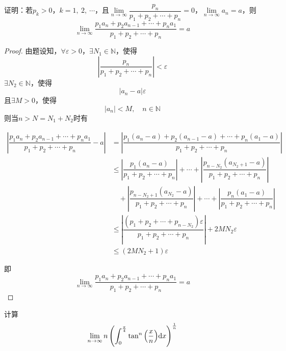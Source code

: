 \begin{proposition}
    
    证明：若$p_k > 0$，$k = 1,\ 2,\ \cdots$，且$\lim\limits_{n\to \infty}{\dfrac{p_n}{p_1 + p_2 + \cdots + p_n}} = 0$，$\lim\limits_{n\to\infty}{a_n} = a$，则
    $$\lim\limits_{n\to\infty}{\dfrac{p_1 a_n + p_2 a_{n-1} + \cdots + p_n a_1}{p_1 + p_2 + \cdots + p_n}} = a$$

\end{proposition}

\begin{proof}

    由题设知，$\forall \varepsilon > 0$，$\exists N_1 \in \mathbb{N}$，使得
    $$\left| \dfrac{p_n}{p_1 + p_2 + \cdots + p_n} \right| < \varepsilon$$
    $\exists N_2 \in \mathbb{N}$，使得
    $$|a_n - a| \varepsilon$$
    且$\exists M > 0$，使得
    $$|a_n| < M, \quad n \in \mathbb{N}$$
    则当$n > N = N_1 + N_2$时有

    \begin{align*}
        \left|\dfrac{p_1 a_n + p_2 a_{n-1} + \cdots + p_n a_1}{p_1 + p_2 + \cdots + p_n} - a\right| & = \left| \dfrac{p_1 (a_n - a) + p_2 (a_{n-1} - a) + \cdots + p_n (a_1 - a)}{p_1 + p_2 + \cdots + p_n} \right| \\
        & \leq \left| \dfrac{p_1 (a_n - a)}{p_1 + p_2 + \cdots + p_n} \right| + \cdots + \left| \dfrac{p_{n - N_2} (a_{N_2 + 1} - a)}{p_1 + p_2 + \cdots + p_n} \right| \\
        & \quad + \left| \dfrac{p_{n - N_2 + 1} (a_{N_2} - a)}{p_1 + p_2 + \cdots + p_n} \right| + \cdots + \left| \dfrac{p_n (a_1 - a)}{p_1 + p_2 + \cdots + p_n} \right| \\
        & \leq \left| \dfrac{(p_1 + p_2 + \cdots + p_{n - N_2})\varepsilon}{p_1 + p_2 + \cdots + p_n} \right| + 2M N_2 \varepsilon \\
        & \leq (2M N_2 + 1) \varepsilon
    \end{align*}

    即
    $$\lim\limits_{n\to\infty}{\dfrac{p_1 a_n + p_2 a_{n-1} + \cdots + p_n a_1}{p_1 + p_2 + \cdots + p_n}} = a$$
    
\end{proof}

\begin{proposition}

    计算
    $$\lim\limits_{n\to\infty}{n\left(\int_{0}^{\frac{\pi}{4}}{\tan^n{\left(\dfrac{x}{n}\right)}}\mathrm{d} x\right)^{\frac{1}{n}}}$$

\end{proposition}

